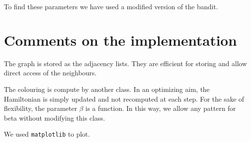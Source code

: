 \documentclass[a4paper, 11pt]{article}
\begin{document}
To find these parameters we have used a modified version of the bandit. 


\section{Comments on the implementation}

The graph is stored as the adjacency lists. They are efficient for storing and allow direct access of the neighbours.

The colouring is compute by another class. In an optimizing aim, the Hamiltonian is simply updated and not recomputed at each step. For the sake of flexibility, the parameter $\beta$ is a function. In this way, we allow any pattern for beta without modifying this class.

We used \texttt{matplotlib} to plot.



\end{document}

